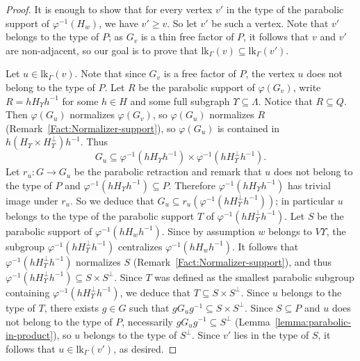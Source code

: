 \documentclass[a4paper,english,11pt]{article}
\theoremstyle{definition}
\theoremstyle{remark}
\newcommand{\lk}{\mathrm{lk}}
\begin{document}
\begin{proof}
It is enough to show that for every vertex $v'$ in the type of {the parabolic support of} $\varphi^{-1}(H_w)$, we have $v'\ge v$. So let $v'$ be such a vertex. Note that $v'$ belongs to the type of $P$; as $G_v$ is a thin free factor of $P$, it follows that $v$ and $v'$ are non-adjacent, so our goal is to prove that $\lk_\Gamma(v)\subseteq\lk_\Gamma(v')$.

Let $u\in\lk_\Gamma(v)$. Note that since $G_v$ is a free factor of $P$, the vertex $u$ does not belong to the type of $P$. Let $R$ be the parabolic support of $\varphi(G_v)$, write $R=hH_{\Upsilon}h^{-1}$ for some $h\in H$ and some full subgraph $\Upsilon\subseteq\Lambda$. Notice that $R\subseteq Q$. Then $\varphi(G_u)$ normalizes $\varphi(G_v)$, so $\varphi(G_u)$ normalizes $R$ (Remark~\ref{Fact:Normalizer-support}), so $\varphi(G_u)$ is contained in $h (H_\Upsilon\times H_{\Upsilon}^\perp)h^{-1}$. Thus
\begin{equation*}
    G_u\subseteq\varphi^{-1}\left(hH_\Upsilon h^{-1} \right) \times \varphi^{-1}\left(hH_{\Upsilon}^\perp h^{-1}\right).
\end{equation*}
Let $r_u:G\to G_u$ be the parabolic retraction and remark that $u$ does not belong to the type of $P$ and $\varphi^{-1}(hH_\Upsilon h^{-1})\subseteq P$. Therefore $\varphi^{-1}(hH_\Upsilon h^{-1})$ has trivial image under $r_u$. 
So we deduce that $G_u\subseteq r_u(\varphi^{-1}(hH_{\Upsilon}^\perp h^{-1}))$; in particular $u$ belongs to the type of the parabolic support $T$ of $\varphi^{-1}(hH_\Upsilon^\perp h^{-1})$. Let $S$ be the parabolic support of $\varphi^{-1}(hH_wh^{-1})$. Since by assumption $w$ belongs to $V\Upsilon$, the subgroup $\varphi^{-1}(hH_{\Upsilon}^\perp h^{-1})$ centralizes $\varphi^{-1}(hH_w h^{-1})$. It follows that $\varphi^{-1}(hH_{\Upsilon}^\perp h^{-1})$ normalizes $S$ 
(Remark~\ref{Fact:Normalizer-support}), and thus $\varphi^{-1}(hH_{\Upsilon}^\perp h^{-1})\subseteq S\times S^{\perp}$. Since $T$ was defined as the smallest parabolic subgroup containing $\varphi^{-1}(hH_{\Upsilon}^\perp h^{-1})$, we deduce that $T\subseteq S\times S^\perp$. Since $u$ belongs to the type of $T$, there exists $g\in G$ such that $gG_ug^{-1}\subseteq S\times S^\perp$. Since $S\subseteq P$ and $u$ does not belong to the type of $P$, necessarily $gG_ug^{-1}\subseteq S^\perp$ (Lemma~\ref{lemma:parabolic-in-product}), so $u$ belongs to the type of $S^\perp$. 
Since $v'$ lies in the type of $S$, it follows that $u\in\lk_\Gamma(v')$, as desired. 
\end{proof}
\end{document}
